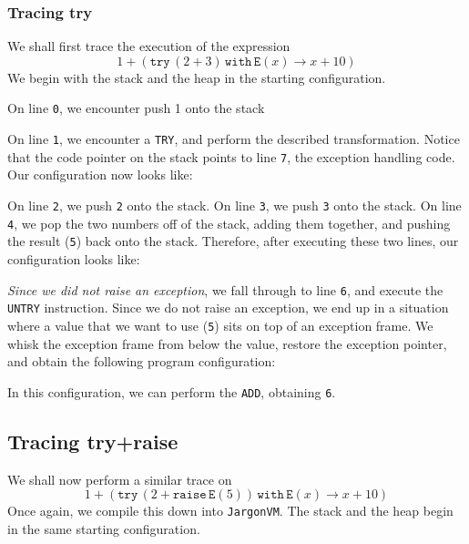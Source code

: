 \subsubsection{Tracing try}
We shall first trace the execution of the expression
\[ 1+(\texttt{try} \, (2+3)\, \texttt{with} \, \texttt{E}(x) \to x+10)\]
We begin with the stack and the heap in the starting configuration.
\begin{center}
\end{center}

On line \texttt{0}, we encounter push 1 onto the stack
\begin{center}
\end{center}

On line \texttt{1}, we encounter a \texttt{TRY}, and perform the described transformation. Notice that the code pointer on the stack points to line \texttt{7}, the exception handling code. Our configuration now looks like:
\begin{center}
\end{center}

On line \texttt{2}, we push \texttt{2} onto the stack. On line \texttt{3}, we push \texttt{3} onto the stack. On line \texttt{4}, we pop the two numbers off of the stack, adding them together, and pushing the result (\texttt{5}) back onto the stack. Therefore, after executing these two lines, our configuration looks like:
\begin{center}
\end{center}

\textit{Since we did not raise an exception}, we fall through to line \texttt{6}, and execute the \texttt{UNTRY} instruction. Since we do not raise an exception, we end up in a situation where a value that we want to use (\texttt{5}) sits on top of an exception frame. We whisk the exception frame from below the value, restore the exception pointer, and obtain the following program configuration:
\begin{center}
\end{center}

In this configuration, we can perform the \texttt{ADD}, obtaining \texttt{6}. 

\subsection{Tracing try+raise}
We shall now perform a similar trace on 
\[ 1+ (\texttt{try} \, (2+\texttt{raise}\, \texttt{E}(5))\, \texttt{with} \, \texttt{E}(x) \to x+10)\]
Once again, we compile this down into \texttt{JargonVM}. The stack and the heap begin in the same starting configuration.

